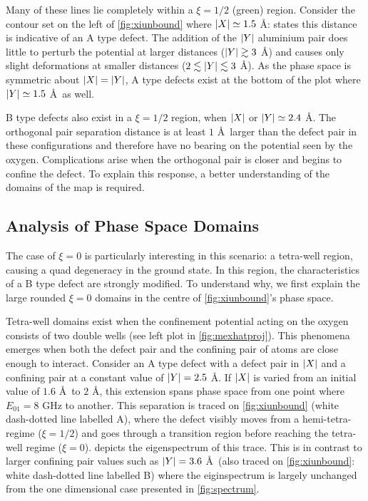 Many of these lines lie completely within a $\xi = 1/2$ (green) region.
Consider the contour set on the left of \cref{fig:xiunbound} where $\lvert X\rvert \simeq 1.5$ \AA:  states this distance is indicative of an A type defect.
The addition of the $\lvert Y\rvert$ aluminium pair does little to perturb the potential at larger distances ($\lvert Y\rvert \gtrsim 3$ \AA) and causes only slight deformations at smaller distances ($2 \lesssim \lvert Y\rvert \lesssim 3$ \AA).
As the phase space is symmetric about $\lvert X\rvert = \lvert Y\rvert$, A type defects exist at the bottom of the plot where $\lvert Y\rvert \simeq 1.5$ \AA\ as well.

B type defects also exist in a $\xi = 1/2$ region, when $\lvert X\rvert$ or $\lvert Y\rvert \simeq 2.4$ \AA.
The orthogonal pair separation distance is at least $1$ \AA\ larger than the defect pair in these configurations and therefore have no bearing on the potential seen by the oxygen.
Complications arise when the orthogonal pair is closer and begins to confine the defect.
To explain this response, a better understanding of the domains of the map is required.

\subsection{Analysis of Phase Space Domains}\label{subsec:phaseanalysis}

The case of $\xi = 0$ is particularly interesting in this scenario: a tetra-well region, causing a quad degeneracy in the ground state.
In this region, the characteristics of a B type defect are strongly modified.
To understand why, we first explain the large rounded $\xi = 0$ domains in the centre of \cref{fig:xiunbound}'s phase space.

Tetra-well domains exist when the confinement potential acting on the oxygen consists of two double wells (see left plot in \cref{fig:mexhatproj}).
This phenomena emerges when both the defect pair and the confining pair of atoms are close enough to interact.
Consider an A type defect with a defect pair in $\lvert X\rvert$ and a confining pair at a constant value of $\lvert Y\rvert = 2.5$ \AA.
If $\lvert X\rvert$ is varied from an initial value of $1.6$ \AA\ to $2$ \AA, this extension spans phase space from one point where $E_{01} = 8$ GHz to another.
This separation is traced on \cref{fig:xiunbound} (white dash-dotted line labelled A), where the defect visibly moves from a hemi-tetra- regime ($\xi = 1/2$) and goes through a transition region before reaching the tetra-well regime ($\xi = 0$).
 depicts the eigenspectrum of this trace.
This is in contrast to larger confining pair values such as $\lvert Y\rvert = 3.6$ \AA\ (also traced on \cref{fig:xiunbound}: white dash-dotted line labelled B) where the eiginspectrum is largely unchanged from the one dimensional case presented in \cref{fig:spectrum}.


